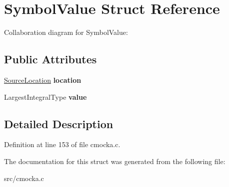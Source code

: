 \hypertarget{structSymbolValue}{}\section{Symbol\+Value Struct Reference}
\label{structSymbolValue}


Collaboration diagram for Symbol\+Value\+:
\subsection*{Public Attributes}
\begin{DoxyCompactItemize}
\item 
\mbox{\label{structSymbolValue_a9d841d4c3b663a12c9bf0056d6664b41}} 
\hyperlink{structSourceLocation}{Source\+Location} {\bfseries location}
\item 
\mbox{\label{structSymbolValue_aaa77effaf2204ad1b18f6a2379590750}} 
Largest\+Integral\+Type {\bfseries value}
\end{DoxyCompactItemize}


\subsection{Detailed Description}


Definition at line 153 of file cmocka.\+c.



The documentation for this struct was generated from the following file\+:\begin{DoxyCompactItemize}
\item 
src/cmocka.\+c\end{DoxyCompactItemize}
